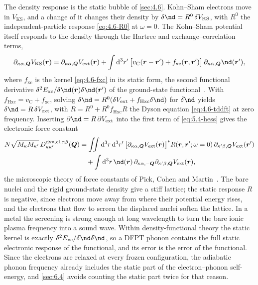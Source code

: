 The density response is the static bubble of \cref{sec:4.6}. Kohn--Sham electrons move in $V_{\mathrm{KS}}$, and a change of it changes their density by $\delta\nd = R^0\,\delta V_{\mathrm{KS}}$, with $R^0$ the independent-particle response \cref{eq:4.6-R0} at $\omega = 0$. The Kohn--Sham potential itself responds to the density through the Hartree and exchange--correlation terms,
\begin{equation}
  \partial_{\kappa\alpha,\vect{Q}}V_{\mathrm{KS}}(\vect{r}) = \partial_{\kappa\alpha,\vect{Q}}V_{\mathrm{ext}}(\vect{r}) + \int\dd^3r'\,\bigl[v_{\mathrm{C}}(\vect{r}-\vect{r}') + f_{\mathrm{xc}}(\vect{r},\vect{r}')\bigr]\,\partial_{\kappa\alpha,\vect{Q}}\nd(\vect{r}') ,
  \label{eq:5.4-dV}
\end{equation}
where $f_{\mathrm{xc}}$ is the kernel \cref{eq:4.6-fxc} in its static form, the second functional derivative $\delta^2E_{\mathrm{xc}}/\delta\nd(\vect{r})\delta\nd(\vect{r}')$ of the ground-state functional~\cite[Eqs.~(42)--(46)]{giustino2017electron}. With $f_{\mathrm{Hxc}} = v_{\mathrm{C}} + f_{\mathrm{xc}}$, solving $\delta\nd = R^0(\delta V_{\mathrm{ext}} + f_{\mathrm{Hxc}}\delta\nd)$ for $\delta\nd$ yields $\delta\nd = R\,\delta V_{\mathrm{ext}}$, with $R = R^0 + R^0f_{\mathrm{Hxc}}R$ the Dyson equation \cref{eq:4.6-tddft} at zero frequency. Inserting $\partial\nd = R\,\partial V_{\mathrm{ext}}$ into the first term of \cref{eq:5.4-hess} gives the electronic force constant
\begin{equation*}
  \begin{split}
  N\sqrt{M_\kappa M_{\kappa'}}\,D^{\mathrm{dyn,el},\alpha\beta}_{\kappa\kappa'}(\vect{Q})
  &= \iint\dd^3r\,\dd^3r'\,\bigl[\partial_{\kappa\alpha,\vect{Q}}V_{\mathrm{ext}}(\vect{r})\bigr]^*R(\vect{r},\vect{r}';\omega = 0)\,\partial_{\kappa'\beta,\vect{Q}}V_{\mathrm{ext}}(\vect{r}') \\
  &\quad + \int\dd^3r\,\nd(\vect{r})\,\partial_{\kappa\alpha,-\vect{Q}}\partial_{\kappa'\beta,\vect{Q}}V_{\mathrm{ext}}(\vect{r}) ,
  \end{split}
\end{equation*}
the microscopic theory of force constants of Pick, Cohen and Martin~\cite{pick1970microscopic}. The bare nuclei and the rigid ground-state density give a stiff lattice; the static response $R$ is negative, since electrons move away from where their potential energy rises, and the electrons that flow to screen the displaced nuclei soften the lattice. In a metal the screening is strong enough at long wavelength to turn the bare ionic plasma frequency into a sound wave. Within density-functional theory the static kernel is exactly $\delta^2E_{\mathrm{xc}}/\delta\nd\delta\nd$, so a DFPT phonon contains the full static electronic response of the functional, and its error is the error of the functional. Since the electrons are relaxed at every frozen configuration, the adiabatic phonon frequency already includes the static part of the electron--phonon self-energy, and \cref{sec:6.4} avoids counting the static part twice for that reason.

